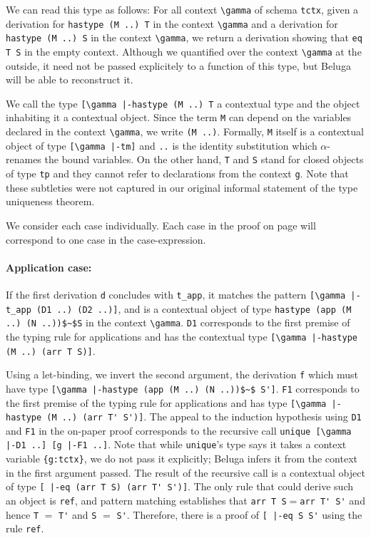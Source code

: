 We can read this type as follows: For all context \lstinline!\gamma! of
schema \lstinline!tctx!, given a derivation for
\lstinline!hastype (M ..) T! in the context \lstinline!\gamma! and a derivation for
\lstinline!hastype (M ..) S! in the context \lstinline!\gamma!, we return a
derivation showing that \lstinline!eq T S! in the empty context.
Although we quantified over the context \lstinline!\gamma! at the outside,
it need not be passed explicitely to a function of this type, but
Beluga will be able to reconstruct it.

We call the type \lstinline![\gamma |-hastype (M ..) T! a contextual type and
the object inhabiting it a contextual object.
Since the term \lstinline!M! can depend on the variables declared in the
context \lstinline!\gamma!, we  write  \lstinline!(M ..)!. Formally,
\lstinline!M! itself is a contextual object of type
\lstinline![\gamma |-tm]! and \lstinline!..! is the identity substitution
which $\alpha$-renames the bound variables.
On the other hand, \lstinline!T! and \lstinline!S! stand for closed
objects of type \lstinline!tp! and they cannot refer to declarations
from the context \lstinline!g!. Note that these subtleties were not
captured in our original informal statement of the type uniqueness
theorem.

We consider each case individually. Each case in the proof on page
\pageref{sec:thmunique} will correspond to one case in the
case-expression.
%
\paragraph{Application case:} If the first derivation \lstinline{d} concludes
with \lstinline{t_app}, it matches
the pattern \lstinline![\gamma |-t_app (D1 ..) (D2 ..)]!, and is
a contextual object of type
\lstinline!hastype (app (M ..) (N ..))$~$S! in the context \lstinline!\gamma!.  %
\lstinline!D1! corresponds to the first
premise of the typing rule for applications and has the contextual type
\lstinline![\gamma |-hastype (M ..) (arr T S)]!.

Using a let-binding, we invert the second
argument, the derivation \lstinline{f} which
must have type
\lstinline![\gamma |-hastype (app (M ..) (N ..))$~$ S']!. \lstinline!F1!
corresponds to the first premise of the typing rule for applications
and has type \lstinline![\gamma |-hastype (M ..) (arr T' S')]!.
The appeal to the induction hypothesis using \lstinline{D1} and \lstinline{F1} in the
on-paper proof
corresponds to the recursive call
 \lstinline!unique [\gamma |-D1 ..] [g |-F1 ..]!.
Note that while \lstinline!unique!'s type says it takes a context variable \lstinline!{g:tctx}!,
we do not pass it explicitly; Beluga infers it from the context in the first argument
passed.
The result of the recursive call is a contextual object of type
\lstinline![ |-eq (arr T S) (arr T' S')]!. The only rule that
could derive such an object is \lstinline{ref}, and pattern matching
establishes that \lstinline!arr T S!$=$\lstinline!arr T' S'! and hence
\lstinline!T! $=$ \lstinline!T'! and \lstinline!S! $=$ \lstinline!S'!.
Therefore, there is a proof of \lstinline![ |-eq S S'! using the
rule \lstinline!ref!.

